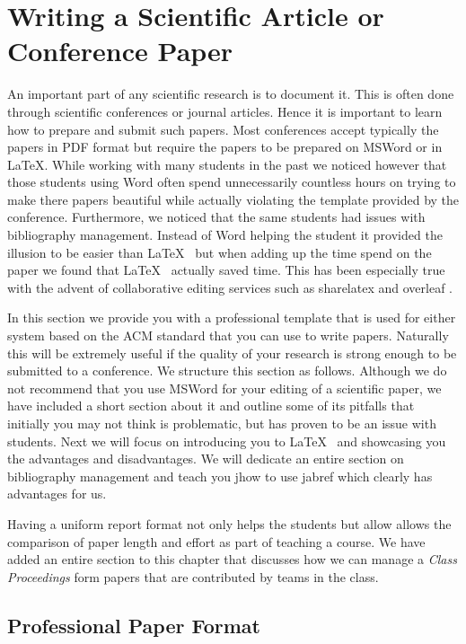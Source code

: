 \FILENAME

\section{Writing a Scientific Article or Conference Paper}
\label{S:writing}

An important part of any scientific research is to document it. This is
often done through scientific conferences or journal articles. Hence it
is important to learn how to prepare and submit such papers. Most
conferences accept typically the papers in PDF format but require the
papers to be prepared on MSWord or in \LaTeX. While working with many
students in the past we noticed however that those students using Word
often spend unnecessarily countless hours on trying to make there papers
beautiful while actually violating the template provided by the
conference. Furthermore, we noticed that the same students had issues
with bibliography management. Instead of Word helping the student it
provided the illusion to be easier than \LaTeX~ but when adding up the
time spend on the paper we found that \LaTeX~ actually saved time. This
has been especially true with the advent of collaborative editing
services such as sharelatex \cite{www-sharelatex} and overleaf
\cite{www-overleaf}. 

In this section we provide you with a professional template that is used
for either system based on the ACM standard that you can use to write
papers. Naturally this will be extremely useful if the quality of your
research is strong enough to be submitted to a conference. We structure
this section as follows. Although we do not recommend that you use
MSWord for your editing of a scientific paper, we have included a short
section about it and outline some of its pitfalls that initially you may
not think is problematic, but has proven to be an issue with students.
Next we will focus on introducing you to \LaTeX~ and showcasing you the
advantages and disadvantages. We will dedicate an entire section on
bibliography management and teach you jhow to use jabref which clearly
has advantages for us.

Having a uniform report format not only helps the students but allow
allows the comparison of paper length and effort as part of teaching a
course. We have added an entire section to this chapter that discusses
how we can manage a \emph{Class Proceedings} form papers that are
contributed by teams in the class.

\subsection{Professional Paper Format}\label{professional-paper-format}

